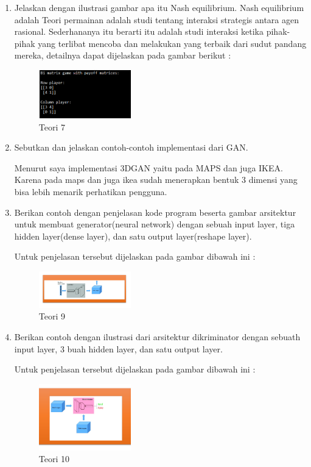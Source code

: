 \begin{enumerate}
	\item Jelaskan dengan ilustrasi gambar apa itu Nash equilibrium.
	\hfill\break
	Nash equilibrium adalah Teori permainan adalah studi tentang interaksi strategis antara agen rasional. Sederhananya itu berarti itu adalah studi interaksi ketika pihak-pihak yang terlibat mencoba dan melakukan yang terbaik dari sudut pandang mereka, detailnya dapat dijelaskan pada gambar berikut : 

	\begin{figure}[H]
	\centering
		\includegraphics[width=4cm]{figures/1174073/tugas8/materi/teori7.PNG}
		\caption{Teori 7}
	\end{figure}

	\item Sebutkan dan jelaskan contoh-contoh implementasi dari GAN.

	\hfill\break
	Menurut saya implementasi 3DGAN yaitu pada MAPS dan juga IKEA. Karena pada maps dan juga ikea sudah menerapkan bentuk 3 dimensi yang bisa lebih menarik perhatikan pengguna.

	\item Berikan contoh dengan penjelasan kode program beserta gambar arsitektur untuk membuat generator(neural network) dengan sebuah input layer, tiga hidden layer(dense layer), dan satu output layer(reshape layer).
	\hfill\break

	Untuk penjelasan tersebut dijelaskan pada gambar dibawah ini :

	\begin{figure}[H]
	\centering
		\includegraphics[width=4cm]{figures/1174073/tugas8/materi/teori9.PNG}
		\caption{Teori 9}
	\end{figure}

	\item Berikan contoh dengan ilustrasi dari arsitektur dikriminator dengan sebuath input layer, 3 buah hidden layer, dan satu output layer.
	\hfill\break

	Untuk penjelasan tersebut dijelaskan pada gambar dibawah ini :

	\begin{figure}[H]
	\centering
		\includegraphics[width=4cm]{figures/1174073/tugas8/materi/teori10.PNG}
		\caption{Teori 10}
	\end{figure}


\end{enumerate}
